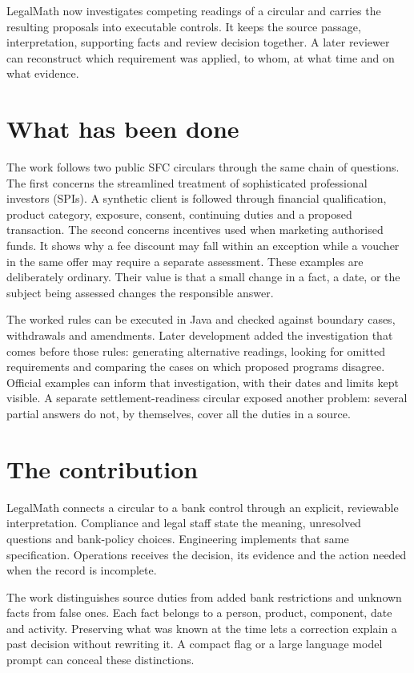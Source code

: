 \documentclass[12pt,a4paper,oneside,openany]{book}
\begin{document}
LegalMath now investigates competing readings of a circular and carries the
resulting proposals into executable controls. It keeps the source passage,
interpretation, supporting facts and review decision together. A later reviewer
can reconstruct which requirement was applied, to whom, at what time and on what
evidence.

\section*{What has been done}

The work follows two public SFC circulars through the same chain of questions.
The first concerns the streamlined treatment of sophisticated professional
investors (SPIs). A synthetic client is followed through financial qualification,
product category, exposure, consent, continuing duties and a proposed
transaction. The second concerns incentives used when marketing authorised
funds. It shows why a fee discount may fall within an exception while a voucher
in the same offer may require a separate assessment. These examples are
deliberately ordinary. Their value is that a small change in a fact, a date, or
the subject being assessed changes the responsible answer.

The worked rules can be executed in Java and checked against boundary cases,
withdrawals and amendments. Later development added the investigation that comes
before those rules: generating alternative readings, looking for omitted
requirements and comparing the cases on which proposed programs disagree.
Official examples can inform that investigation, with their dates and limits
kept visible. A separate settlement-readiness circular exposed another problem:
several partial answers do not, by themselves, cover all the duties in a source.

\section*{The contribution}

LegalMath connects a circular to a bank control through an explicit, reviewable
interpretation. Compliance and legal staff state the meaning, unresolved
questions and bank-policy choices. Engineering implements that same
specification. Operations receives the decision, its evidence and the action
needed when the record is incomplete.

\newpage
The work distinguishes source duties from added bank restrictions and unknown
facts from false ones. Each fact belongs to a person, product, component, date
and activity. Preserving what was known at the time lets a correction explain
a past decision without rewriting it. A compact flag or a large language model
prompt can conceal these distinctions.
\end{document}
